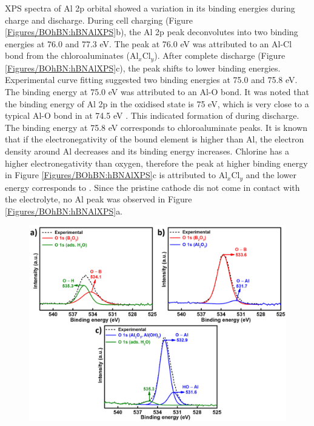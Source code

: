 XPS spectra of Al 2p orbital showed a variation in its binding energies during charge and discharge. During cell charging (Figure \ref{Figures/BOhBN:hBNAlXPS}b), the Al 2p peak deconvolutes into two binding energies at 76.0 and 77.3 eV. The peak at 76.0 eV was attributed to an Al-Cl bond from the chloroaluminates (Al$_{x}$Cl$_{y}$). After complete discharge (Figure \ref{Figures/BOhBN:hBNAlXPS}c), the peak shifts to lower binding energies. Experimental curve fitting suggested two binding energies at 75.0 and 75.8 eV. The binding energy at 75.0 eV was attributed to an Al-O bond. It was noted that the binding energy of Al 2p in the oxidised state is 75 eV, which is very close to a typical Al-O bond in  at 74.5 eV \cite{}. This indicated formation of  during discharge. The binding energy at 75.8 eV corresponds to chloroaluminate peaks. It is known that if the electronegativity of the bound element is higher than Al, the electron density around Al decreases and its binding energy increases. Chlorine has a higher electronegativity than oxygen, therefore the peak at higher binding energy in Figure \ref{Figures/BOhBN:hBNAlXPS}c is attributed to Al$_{x}$Cl$_{y}$ and the lower energy corresponds to . Since the pristine cathode dis not come in contact with the electrolyte, no Al peak was observed in Figure \ref{Figures/BOhBN:hBNAlXPS}a.

\begin{figure}[tbh!]
\centering
\includegraphics[width=\textwidth]{Figures/BOhBN/hBNOXPS}
\caption{}
\label{Figures/BOhBN:hBNOXPS}
\end{figure}

